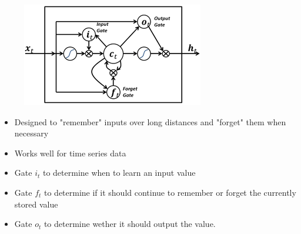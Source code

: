 \documentclass[11pt, a4paper, landscape]{article}
\begin{document}
\NewPage{}

\vfill
\begin{figure}[H]
\begin{center}
  \includegraphics[width=.5\textwidth]{../article/img/Long_Short_Term_Memory}
\end{center}
\end{figure}
\vfill
\begin{itemize}
\item Designed to "remember" inputs over long distances and "forget" them when necessary
\item Works well for time series data
\end{itemize}
\begin{itemize}
\item Gate \(i_t\) to determine when to learn an input value
\item Gate \(f_t\) to determine if it should continue to remember or forget the currently stored value
\item Gate \(o_t\) to determine wether it should output the value.
\end{itemize}
\vfill


\NewPage{}
\end{document}
